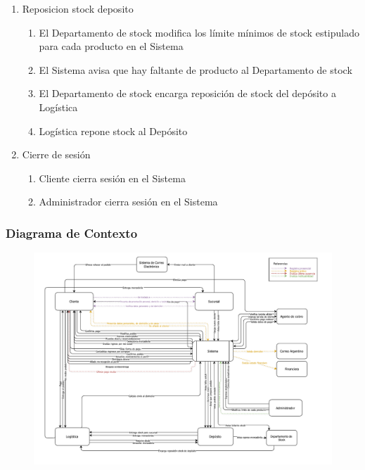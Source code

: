 \begin{enumerate}
 \item Reposicion stock deposito
  \begin{enumerate}
    \item El Departamento de stock modifica los límite m\'inimos de stock estipulado para cada producto en el Sistema
    \item El Sistema avisa que hay faltante de producto al Departamento de stock
    \item El Departamento de stock encarga reposición de stock del depósito a Logística
    \item Logística repone stock al Depósito
  \end{enumerate}

 \item Cierre de sesi\'on
  \begin{enumerate}
    \item Cliente cierra sesión en el Sistema 
    \item Administrador	cierra sesión en el Sistema 
  \end{enumerate}
\end{enumerate}
\clearpage

\subsubsection{Diagrama de Contexto}

\begin{figure}[H]
  \begin{center}
  \includegraphics[height=0.65\textheight,angle=90]{images/contexto.pdf}
  \end{center}
\end{figure}
